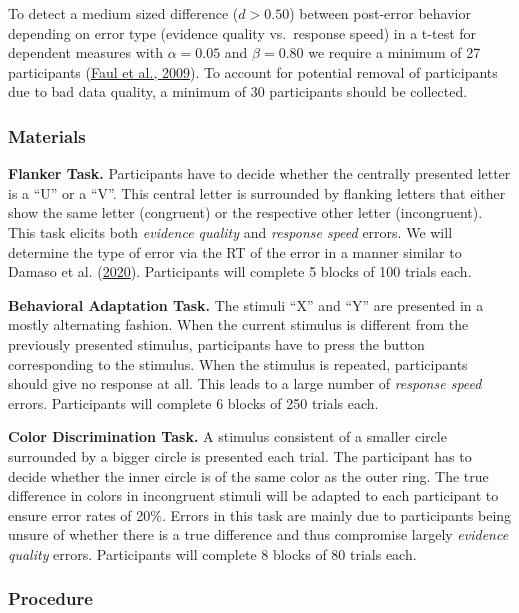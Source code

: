 \documentclass[
  man,floatsintext]{apa7}
\begin{document}
To detect a medium sized difference (\(d > 0.50\)) between post-error behavior depending on error type (evidence quality vs.~response speed) in a t-test for dependent measures with \(\alpha = 0.05\) and \(\beta = 0.80\) we require a minimum of 27 participants (\protect\hyperlink{ref-faul2009statistical}{Faul et al., 2009}). To account for potential removal of participants due to bad data quality, a minimum of 30 participants should be collected.

\hypertarget{materials}{%
\subsubsection{Materials}\label{materials}}

\textbf{Flanker Task.} Participants have to decide whether the centrally presented letter is a ``U'' or a ``V''. This central letter is surrounded by flanking letters that either show the same letter (congruent) or the respective other letter (incongruent). This task elicits both \emph{evidence quality} and \emph{response speed} errors. We will determine the type of error via the RT of the error in a manner similar to Damaso et al. (\protect\hyperlink{ref-damaso2020}{2020}). Participants will complete 5 blocks of 100 trials each.

\textbf{Behavioral Adaptation Task.} The stimuli ``X'' and ``Y'' are presented in a mostly alternating fashion. When the current stimulus is different from the previously presented stimulus, participants have to press the button corresponding to the stimulus. When the stimulus is repeated, participants should give no response at all. This leads to a large number of \emph{response speed} errors. Participants will complete 6 blocks of 250 trials each.

\textbf{Color Discrimination Task.} A stimulus consistent of a smaller circle surrounded by a bigger circle is presented each trial. The participant has to decide whether the inner circle is of the same color as the outer ring. The true difference in colors in incongruent stimuli will be adapted to each participant to ensure error rates of 20\%. Errors in this task are mainly due to participants being unsure of whether there is a true difference and thus compromise largely \emph{evidence quality} errors. Participants will complete 8 blocks of 80 trials each.

\hypertarget{procedure}{%
\subsubsection{Procedure}\label{procedure}}
\end{document}
